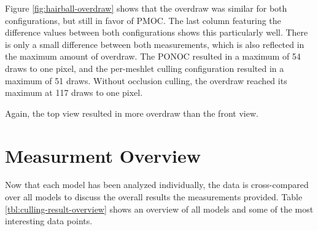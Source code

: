 \noindent
Figure \ref{fig:hairball-overdraw} shows that the overdraw was similar for both configurations, 
but still in favor of \ac{PMOC}. The last column featuring the difference 
values between both configurations shows this particularly well. There is only a small difference 
between both measurements, which is also reflected in the maximum amount of overdraw. The 
\ac{PONOC} resulted in a maximum of 54 draws to one pixel, and the per-meshlet 
culling configuration resulted in a maximum of 51 draws. Without occlusion culling, the overdraw 
reached its maximum at 117 draws to one pixel. 

Again, the top view resulted in more 
overdraw than the front view.

\clearpage



\section*{Measurment Overview}

Now that each model has been analyzed individually, the data is cross-compared over all models to 
discuss the overall results the measurements provided. Table \ref{tbl:culling-result-overview} shows 
an overview of all models and some of the most interesting data points. 
  
